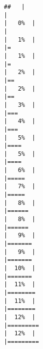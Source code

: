 \documentclass[
]{book}
\begin{document}
\begin{verbatim}
##   |                                                                              |                                                                      |   0%  |                                                                              |                                                                      |   1%  |                                                                              |=                                                                     |   1%  |                                                                              |=                                                                     |   2%  |                                                                              |==                                                                    |   2%  |                                                                              |==                                                                    |   3%  |                                                                              |===                                                                   |   4%  |                                                                              |===                                                                   |   5%  |                                                                              |====                                                                  |   5%  |                                                                              |====                                                                  |   6%  |                                                                              |=====                                                                 |   7%  |                                                                              |=====                                                                 |   8%  |                                                                              |======                                                                |   8%  |                                                                              |======                                                                |   9%  |                                                                              |=======                                                               |   9%  |                                                                              |=======                                                               |  10%  |                                                                              |=======                                                               |  11%  |                                                                              |========                                                              |  11%  |                                                                              |========                                                              |  12%  |                                                                              |=========                                                             |  12%  |                                                                              |========= 
\end{verbatim}
\end{document}
